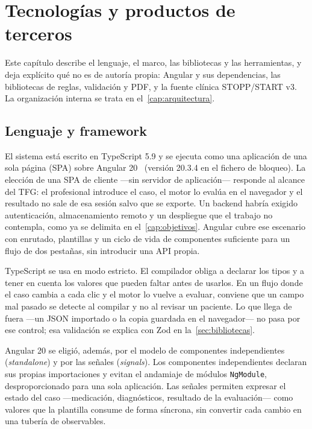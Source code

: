 
\chapter{Tecnologías y productos de terceros}
\label{cap:tecnologias}

Este capítulo describe el lenguaje, el marco, las bibliotecas y las
herramientas, y deja explícito qué no es de autoría propia: Angular y sus
dependencias, las bibliotecas de reglas, validación y PDF, y la fuente
clínica STOPP/START v3. La organización interna se trata en
el~\cref{cap:arquitectura}.

\section{Lenguaje y framework}
\label{sec:lenguaje-framework}

El sistema está escrito en TypeScript 5.9 y se ejecuta como una aplicación
de una sola página (SPA) sobre Angular 20~\cite{angular2026} (versión
20.3.4 en el fichero de bloqueo). La elección
de una SPA de cliente ---sin servidor de aplicación--- responde al alcance
del TFG: el profesional introduce el caso, el motor lo evalúa en el
navegador y el resultado no sale de esa sesión salvo que se exporte. Un
backend habría exigido autenticación, almacenamiento remoto y un
despliegue que el trabajo no contempla, como ya se delimita en
el~\cref{cap:objetivos}. Angular cubre ese escenario con enrutado, plantillas
y un ciclo de vida de componentes suficiente para un flujo de dos pestañas,
sin introducir una API propia.

TypeScript se usa en modo estricto. El compilador obliga a declarar
los tipos y a tener en cuenta los valores que pueden faltar antes de
usarlos. En un flujo donde el caso cambia a cada clic y el motor lo
vuelve a evaluar, conviene que un campo mal pasado se detecte al
compilar y no al revisar un paciente. Lo que llega de fuera ---un JSON
importado o la copia guardada en el navegador--- no pasa por ese
control; esa validación se explica con Zod en la~\cref{sec:bibliotecas}.

Angular 20 se eligió, además, por el modelo de componentes independientes
(\textit{standalone}) y por las señales (\textit{signals}). Los componentes
independientes declaran sus propias importaciones y evitan el andamiaje de
módulos \texttt{NgModule}, desproporcionado para una sola aplicación. Las
señales permiten expresar el estado del caso ---medicación, diagnósticos,
resultado de la evaluación--- como valores que la plantilla consume de
forma síncrona, sin convertir cada cambio en una tubería de observables.

